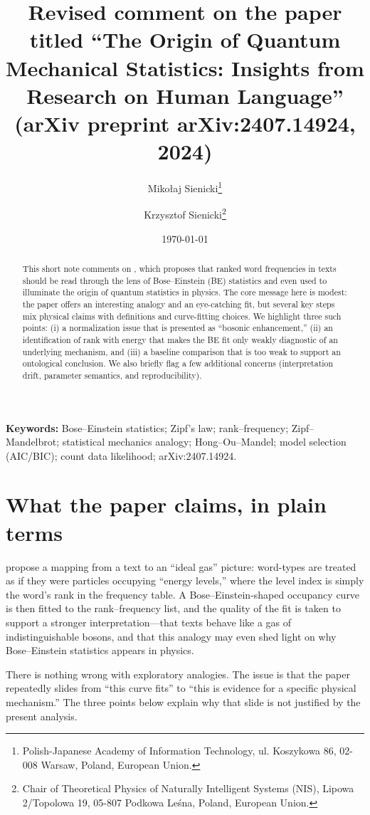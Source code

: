 \documentclass[11pt,a4paper]{article}
\title{Revised comment on the paper titled ``The Origin of Quantum Mechanical Statistics: Insights from Research on Human Language''\\
(arXiv preprint arXiv:2407.14924, 2024)}
\author{Mikołaj Sienicki\thanks{Polish-Japanese Academy of Information Technology, ul. Koszykowa 86, 02-008 Warsaw, Poland, European Union.} \and
Krzysztof Sienicki\thanks{Chair of Theoretical Physics of Naturally Intelligent Systems (NIS), Lipowa 2/Topolowa 19, 05-807 Podkowa Leśna, Poland, European Union.}
}
\date{\today}
\begin{document}
\sloppy

\maketitle

\begin{abstract}
This short note comments on \citet{Aerts2024Origin}, which proposes that ranked word frequencies in texts should be read through the lens of Bose--Einstein (BE) statistics and even used to illuminate the origin of quantum statistics in physics. The core message here is modest: the paper offers an interesting analogy and an eye-catching fit, but several key steps mix physical claims with definitions and curve-fitting choices. We highlight three such points: (i) a normalization issue that is presented as ``bosonic enhancement,'' (ii) an identification of rank with energy that makes the BE fit only weakly diagnostic of an underlying mechanism, and (iii) a baseline comparison that is too weak to support an ontological conclusion. We also briefly flag a few additional concerns (interpretation drift, parameter semantics, and reproducibility).
\end{abstract}

\noindent\textbf{Keywords:} Bose--Einstein statistics; Zipf's law; rank--frequency; Zipf--Mandelbrot;
statistical mechanics analogy; Hong--Ou--Mandel; model selection (AIC/BIC);
count data likelihood; arXiv:2407.14924.
\section{What the paper claims, in plain terms}
\citet{Aerts2024Origin} propose a mapping from a text to an ``ideal gas'' picture: word-types are treated as if they were particles occupying ``energy levels,'' where the level index is simply the word's rank in the frequency table. A Bose--Einstein-shaped occupancy curve is then fitted to the rank--frequency list, and the quality of the fit is taken to support a stronger interpretation---that texts behave like a gas of indistinguishable bosons, and that this analogy may even shed light on why Bose--Einstein statistics appears in physics.

There is nothing wrong with exploratory analogies. The issue is that the paper repeatedly slides from ``this curve fits'' to ``this is evidence for a specific physical mechanism.'' The three points below explain why that slide is not justified by the present analysis.
\end{document}

